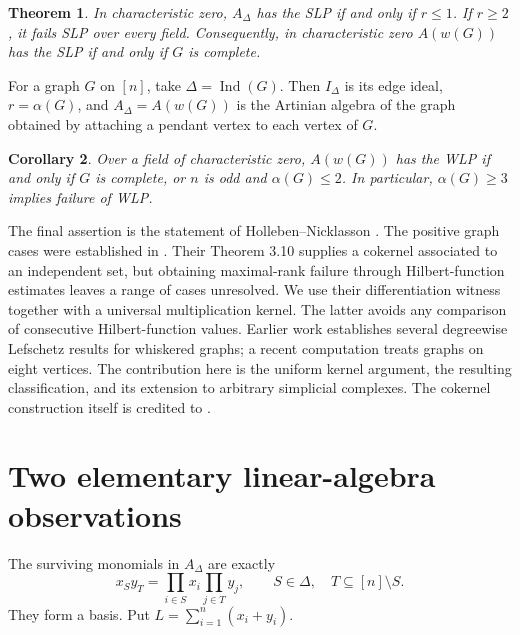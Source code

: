 \documentclass[11pt]{article}
\newtheorem{theorem}{Theorem}[section]
\newtheorem{corollary}[theorem]{Corollary}
\theoremstyle{remark}
\newcommand{\A}{{A_{\Delta}}}
\begin{document}
\begin{theorem}\label{thm:slp}
In characteristic zero, $\A$ has the SLP if and only if $r\leq1$. If $r\geq2$, it fails SLP over every field. Consequently, in characteristic zero $A(w(G))$ has the SLP if and only if $G$ is complete.
\end{theorem}

For a graph $G$ on $[n]$, take $\Delta=\operatorname{Ind}(G)$. Then $I_\Delta$ is its edge ideal, $r=\alpha(G)$, and $\A=A(w(G))$ is the Artinian algebra of the graph obtained by attaching a pendant vertex to each vertex of $G$.

\begin{corollary}\label{cor:graph}
Over a field of characteristic zero, $A(w(G))$ has the WLP if and only if $G$ is complete, or $n$ is odd and $\alpha(G)\leq2$. In particular, $\alpha(G)\geq3$ implies failure of WLP.
\end{corollary}

The final assertion is the statement of Holleben--Nicklasson \cite[Conjectures 1.3 and 3.15]{HN}. The positive graph cases were established in \cite[Propositions 3.2 and 3.5]{HN}. Their Theorem 3.10 supplies a cokernel associated to an independent set, but obtaining maximal-rank failure through Hilbert-function estimates leaves a range of cases unresolved. We use their differentiation witness together with a universal multiplication kernel. The latter avoids any comparison of consecutive Hilbert-function values. Earlier work \cite{CFHNV} establishes several degreewise Lefschetz results for whiskered graphs; a recent computation \cite{Zeng} treats graphs on eight vertices. The contribution here is the uniform kernel argument, the resulting classification, and its extension to arbitrary simplicial complexes. The cokernel construction itself is credited to \cite{HN}.

\section{Two elementary linear-algebra observations}
The surviving monomials in $\A$ are exactly
\[
x_Sy_T=\prod_{i\in S}x_i\prod_{j\in T}y_j,
\qquad S\in\Delta,\quad T\subseteq[n]\setminus S.
\]
They form a basis. Put $L=\sum_{i=1}^n(x_i+y_i)$.
\end{document}
